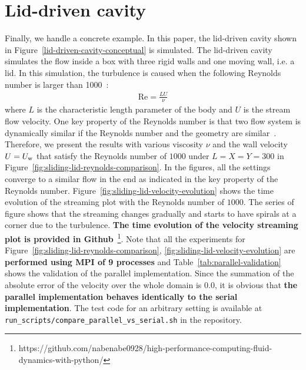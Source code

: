 \section{Lid-driven cavity}
Finally, we handle a concrete example.
In this paper, the lid-driven cavity shown in Figure~\ref{lid-driven-cavity-conceptual} is simulated.
The lid-driven cavity simulates the flow inside a box with
three rigid walls and one moving wall, i.e. a lid.
In this simulation, the turbulence is caused 
when the following Reynolds number is larger than 1000~\cite{chiang1998effect}:
\begin{equation*}
\begin{aligned}
  \text{Re} = \frac{LU}{\nu}
\end{aligned}
\end{equation*}
where $L$ is the characteristic length parameter
of the body and $U$ is the stream flow velocity.
One key property of the Reynolds number is that two flow system
is dynamically similar if the Reynolds number and the geometry are similar~\cite{kundu2008fluid}.
Therefore, we present the results with various 
viscosity $\nu$ and the wall velocity $U = U_{\rm w}$ that 
satisfy the Reynolds number of $1000$ under $L = X = Y = 300$
in Figure~\ref{fig:sliding-lid-reynolds-comparison}.
In the figures, all the settings converge to a similar flow in the end
as indicated in the key property of the Reynolds number.
Figure~\ref{fig:sliding-lid-velocity-evolution} shows the time evolution of
the streaming plot with the Reynolds number of $1000$.
The series of figure shows that the streaming changes gradually
and starts to have spirals at a corner due to the turbulence.
{\bf The time evolution of the velocity streaming plot is provided in
Github}~\footnote{https://github.com/nabenabe0928/high-performance-computing-fluid-dynamics-with-python/}.
Note that all the experiments for
Figure~\ref{fig:sliding-lid-reynolds-comparison}, \ref{fig:sliding-lid-velocity-evolution}
are {\bf performed using MPI of 9 processes}
and Table~\ref{tab:parallel-validation}
shows the validation of the parallel implementation.
Since the summation of the absolute error of the velocity over the whole domain
is $0.0$, it is obvious that
{\bf the parallel implementation behaves identically to the serial implementation}.
The test code for an arbitrary setting is available at {\tt run\_scripts/compare\_parallel\_vs\_serial.sh}
in the repository.

